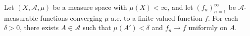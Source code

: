 Let $(X, \mathcal{A}, \mu)$ be a measure space with $\mu(X) < \infty$, and let $(f_n)_{n=1}^{\infty}$ be $\mathcal{A}$-measurable functions converging $\mu$-a.e. to a finite-valued function $f$. For each $\delta > 0$, there exists $A \in \mathcal{A}$ such that $\mu(A') < \delta$ and $f_n \to f$ uniformly on $A$.